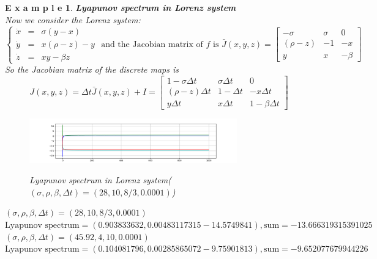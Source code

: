 \documentclass[12pt]{article}
\theoremstyle{plain}
\newtheorem{example}{\textbf{E x a m p l e}}[section]
\begin{document}
\begin{example}\textbf{Lyapunov spectrum in Lorenz system}
\\\noindent Now we consider the Lorenz system:
$$
\left\{\begin{array}{lll}
\dot x & = & \sigma(y - x) \\
\dot y & = & x(\rho - z) - y \\
\dot z & = & xy - \beta z
\end{array}\right. \text{ and the Jacobian matrix of $f$ is } \bar J(x, y, z) = \left[\begin{array}{lll}
-\sigma     & \sigma    & 0         \\
(\rho-z)    & -1        & -x        \\
y           & x         & -\beta
\end{array}\right]
$$
So the Jacobian matrix of the discrete maps is 
$$
J(x, y, z) = \Delta t\bar J(x, y, z) + I = \left[\begin{array}{lll}
1 - \sigma \Delta t     & \sigma \Delta t       & 0                     \\
(\rho-z) \Delta t       & 1 -\Delta t           & -x\Delta t            \\
y\Delta t               & x\Delta t             & 1 -\beta \Delta t
\end{array}\right]
$$
\begin{figure}[H]
\begin{center}
\includegraphics[width=0.8\textwidth]{figure/section5/Lya-spe-Lorenz-1.png} \\
\caption{Lyapunov spectrum in Lorenz system($(\sigma, \rho, \beta, \Delta t) = (28, 10, 8/3, 0.0001)$)}
\end{center}
\end{figure}
  \noindent $(\sigma, \rho, \beta, \Delta t) = (28, 10, 8/3, 0.0001)$
\\\noindent $\text{Lyapunov spectrum} = (0.903833632, 0.00483117315 -14.5749841), \text{sum} = -13.666319315391025$
\\\noindent $(\sigma, \rho, \beta, \Delta t) = (45.92, 4, 10, 0.0001)$
\\\noindent $\text{Lyapunov spectrum} = (0.104081796, 0.00285865072 -9.75901813), \text{sum} = -9.652077679944226$
\end{example}
\end{document}
